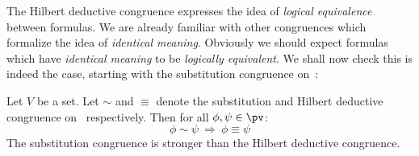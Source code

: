 The Hilbert deductive congruence expresses the idea of {\em logical
equivalence} between formulas. We are already familiar with other
congruences which formalize the idea of {\em identical meaning}.
Obviously we should expect formulas which have {\em identical
meaning} to be {\em logically equivalent}. We shall now check this
is indeed the case, starting with the substitution congruence on
\pv\,:

\begin{prop}\label{logic:prop:FOPL:HDC:substitution:v:HDC}
Let $V$ be a set. Let $\sim$ and $\equiv$ denote the substitution
and Hilbert deductive congruence on \pv\ respectively. Then for all
$\phi,\psi\in\pv$:
    \[
    \phi\sim\psi\ \Rightarrow\ \phi\equiv\psi
    \]
The substitution congruence is stronger than the Hilbert deductive
congruence.
\end{prop}
